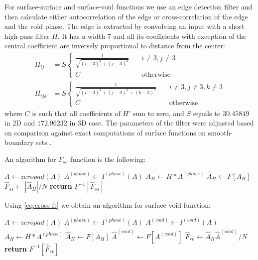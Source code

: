 \documentclass[reprint,amsmath,amssymb,aps,pre,showkeys,showpacs,nofootinbib]{revtex4-1}
\begin{document}
For surface-surface and surface-void functions we use an edge detection filter \cite{samarin2023robust}
and then calculate either autocorrelation of the edge or cross-correlation of
the edge and the void phase. The edge is extracted by convolving an input with a
short high-pass filter $H$. It has a width $7$ and all its coefficients with
exception of the central coefficient are inversely proportional to distance
from the center:
\begin{equation}
  \begin{aligned}
    H_{ij} &= S \left\{
    \begin{array}{cc}
      \frac{1}{\sqrt{(i-3)^2 + (j-3)^2}} & \quad i \ne 3, j \ne 3 \\
      C & \quad \text{otherwise}
    \end{array}
    \right. \\
    H_{ijk} &= S \left\{
    \begin{array}{cc}
      \frac{1}{\sqrt{(i-3)^2 + (j-3)^2 + (k-3)^3}} & \quad i \ne 3, j \ne 3, k
      \ne 3 \\
      C & \quad \text{otherwise}
    \end{array}
    \right.
  \end{aligned}
  \label{eq:filter-7x7}
\end{equation}
where $C$ is such that all coefficients of $H'$ sum to zero, and $S$ equals to
$30.45849$ in 2D and $172.96232$ in 3D case. The parameters of the filter were adjusted
based on comparison against exact computations of surface functions on smooth-boundary
sets \cite{Postnicov2023}.

An algorithm for $F_{ss}$ function is the following:
\begin{algorithmic}[1]
    \State $A \gets zeropad(A)$
  \EndIf
  \State $A^{(phase)} \gets I^{(phase)} (A)$
  \State $A_H \gets H * A^{(phase)}$
  \State $\hat{A}_H \gets F[A_H]$
  \State $\hat{F}_{ss} \gets |\hat{A}_H| / N$
  \State \textbf{return} $F^{-1} [\hat{F}_{ss}]$
  \EndProcedure
\end{algorithmic}

Using \cref{eq:cross-ft} we obtain an algorithm for surface-void function:
\begin{algorithmic}[1]
    \State $A \gets zeropad(A)$
  \EndIf
  \State $A^{(phase)} \gets I^{(phase)} (A)$
  \State $A^{(void)} \gets I^{(void)} (A)$
  \State $A_H \gets H * A^{(phase)}$
  \State $\hat{A}_H \gets F[A_H]$
  \State $\hat{A}^{(void)} \gets F[A^{(void)}]$
  \State $\hat{F}_{sv} \gets \hat{A}_H \overline{\hat{A}^{(void)}} / N$
  \State \textbf{return} $F^{-1} [\hat{F}_{sv}]$
  \EndProcedure
\end{algorithmic}
\end{document}
